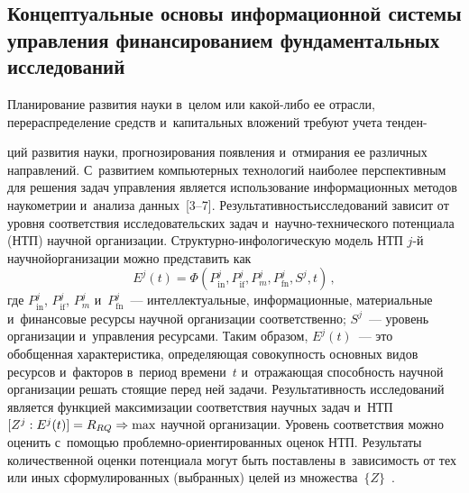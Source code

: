 \begin{multicols}{2}
\vspace*{-12pt}
    
    \section{Концептуальные основы информационной системы 
управления финансированием фундаментальных исследований }
    
    Планирование развития науки в~целом или ка\-кой-ли\-бо ее отрасли, 
перераспределение средств и~капитальных вложений требуют учета тенден-\linebreak\vspace*{-12pt}

\noindent
ций 
развития науки, прогнозирования появления и~отмирания ее различных 
направлений. С~развитием компьютерных технологий наиболее 
перспективным для решения задач управления является использование 
информационных методов нау\-ко\-мет\-рии и~анализа данных~[3--7]. 
Результативность\linebreak исследований зависит от уровня соответствия 
исследовательских задач и~на\-уч\-но-тех\-ни\-че\-ско\-го потенциала (НТП)
научной 
организации. Струк\-тур\-но-ин\-фо\-ло\-ги\-че\-скую модель  
НТП $j$-й научной\linebreak организации можно 
представить как 
    \begin{equation*}
    E^j(t)=\Phi\left( P^j_{\mathrm{in}}, P^j_{\mathrm{if}}, P^j_m, P^j_{\mathrm{fn}}, S^j, t\right)\,,
    \end{equation*}
где $P^j_{\mathrm{in}}$, $P^j_{\mathrm{if}}$, $P^j_m$ и~$P^j_{\mathrm{fn}}$~--- 
интеллектуальные, 
информационные, материальные и~финансовые ресурсы научной организации 
соответственно; $S^j$~--- уровень организации и~управления ресурсами. Таким 
образом, $E^j(t)$~--- это обобщенная характеристика, определяющая 
совокупность основных видов ресурсов и~факторов в~период времени~$t$ 
и~отражающая способность научной организации решать стоящие перед ней 
задачи. Результативность исследований является функцией максимизации 
соответствия научных задач и~НТП
$[Z^j: E^j(t)]\hm= R_{RQ}\Rightarrow \max$ научной организации. Уровень 
соответствия можно оценить с~по\-мощью  
проб\-лем\-но-ори\-ен\-ти\-ро\-ван\-ных оценок НТП. 
Результаты количественной оценки потенциала могут быть 
поставлены в~зависимость от тех или иных сформулированных (выбранных) 
целей из множества~$\{Z\}$~\cite{4-sun}. 


\end{multicols}
